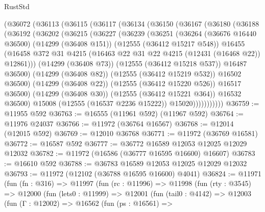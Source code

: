 \begin{lexlean}{RustStd}
\begin{coremodule}
    (@36072
      (@36113
        (@36115
          (@36117
            (@36134
              (@36150
                (@36167
                  (@36180
                    (@36188
                      (@36192
                        (@36202
                          (@36215
                            (@36227
                              (@36239
                                (@36251
                                  (@36264
                                    (@36676 @16440 @36500)
                                    (@14299 (@36408 @151))
                                    (@12555 (@36412 @15217 @548))
                                    @16455
                                    (@16458
                                      @372
                                      @31
                                      @4215
                                      (@16463 @22 @31 @22 @4215 (@12431 (@16468 @22)) @12861)))
                                  (@14299 (@36408 @73))
                                  (@12555 (@36412 @15218 @537))
                                  @16487
                                  @36500)
                                (@14299 (@36408 @82))
                                (@12555 (@36412 @15219 @532))
                                @16502
                                @36500)
                              (@14299 (@36408 @22))
                              (@12555 (@36412 @15220 @526))
                              @16517
                              @36500)
                            (@14299 (@36408 @30))
                            (@12555 (@36412 @15221 @364))
                            @16532
                            @36500)
                          @15008
                          (@12555 (@16537 @2236 @15222))
                          @15020)))))))))))
@36759 := @11955 @592
@36763 := @16555 (@11961 @592) (@11967 @592)
@36764 := @11976 @24037
@36766 := @11972 (@36764 @16567)
@36768 := @12014 (@12015 @592)
@36769 := @12010 @36768
@36771 := @11972 (@36769 @16581)
@36772 := @16587 @592
@36777 := @36772 @16589 @12053 @12025 @12029 @12032
@36782 := @11972 (@16586 (@36777 @16595 @16600) @16607)
@36783 := @16610 @592
@36788 := @36783 @16589 @12053 @12025 @12029 @12032
@36793 := @11972 (@12102 (@36788 @16595 @16600) @4041)
@36824 := @11971
    (fun (fn : @316) =>
    @11997
      (fun (rc : @11996) =>
      @11998
        (fun (rty : @3545) =>
        @12000
          (fun (lets0 : @11999) =>
          @12001
            (fun (tail0 : @4142) =>
            @12003
              (fun (Γ : @12002) =>
              @16562
                (fun (ps : @16561) =>

\end{coremodule}
\end{lexlean}
